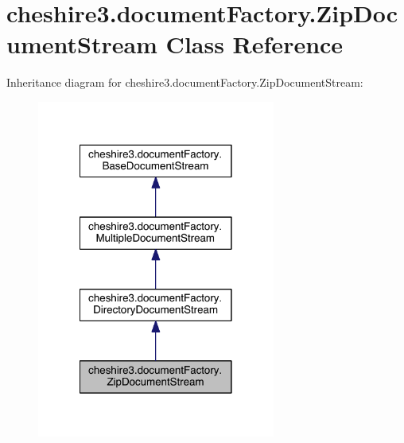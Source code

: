 \hypertarget{classcheshire3_1_1document_factory_1_1_zip_document_stream}{\section{cheshire3.\-document\-Factory.\-Zip\-Document\-Stream Class Reference}
\label{classcheshire3_1_1document_factory_1_1_zip_document_stream}
}


Inheritance diagram for cheshire3.\-document\-Factory.\-Zip\-Document\-Stream\-:
\nopagebreak
\begin{figure}[H]
\begin{center}
\leavevmode
\includegraphics[width=222pt]{classcheshire3_1_1document_factory_1_1_zip_document_stream__inherit__graph}
\end{center}
\end{figure}


